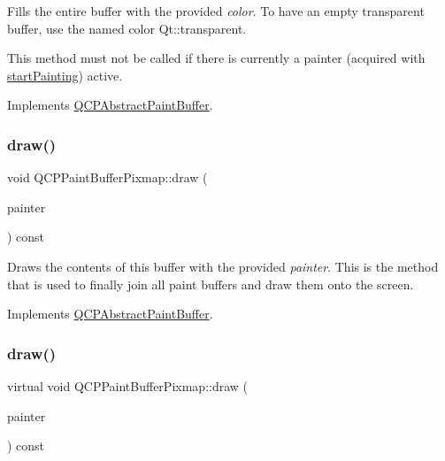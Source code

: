 Fills the entire buffer with the provided {\itshape color}. To have an empty transparent buffer, use the named color {\ttfamily Qt\+::transparent}.

This method must not be called if there is currently a painter (acquired with \hyperlink{class_q_c_p_paint_buffer_pixmap_a357964ef7d28cfa530338be4e5c93234}{start\+Painting}) active. 

Implements \hyperlink{class_q_c_p_abstract_paint_buffer_a9e253f4541dfc01992b77e8830bd7722}{Q\+C\+P\+Abstract\+Paint\+Buffer}.

\mbox{\label{class_q_c_p_paint_buffer_pixmap_af7bfc685e56a0a9329e57cd9a265eb74}} 
\subsubsection{\texorpdfstring{draw()}{draw()}\hspace{0.1cm}{\footnotesize\ttfamily [1/2]}}
{\footnotesize\ttfamily void Q\+C\+P\+Paint\+Buffer\+Pixmap\+::draw (\begin{DoxyParamCaption}\item[{\hyperlink{class_q_c_p_painter}{Q\+C\+P\+Painter} $\ast$}]{painter }\end{DoxyParamCaption}) const\hspace{0.3cm}{\ttfamily [virtual]}}

Draws the contents of this buffer with the provided {\itshape painter}. This is the method that is used to finally join all paint buffers and draw them onto the screen. 

Implements \hyperlink{class_q_c_p_abstract_paint_buffer_afb998c7525e3ae37d9d2d46c7aaf461a}{Q\+C\+P\+Abstract\+Paint\+Buffer}.

\mbox{\label{class_q_c_p_paint_buffer_pixmap_a7f8df231d2439e6b9953b86798815600}} 
\subsubsection{\texorpdfstring{draw()}{draw()}\hspace{0.1cm}{\footnotesize\ttfamily [2/2]}}
{\footnotesize\ttfamily virtual void Q\+C\+P\+Paint\+Buffer\+Pixmap\+::draw (\begin{DoxyParamCaption}\item[{\hyperlink{class_q_c_p_painter}{Q\+C\+P\+Painter} $\ast$}]{painter }\end{DoxyParamCaption}) const\hspace{0.3cm}{\ttfamily [virtual]}}

